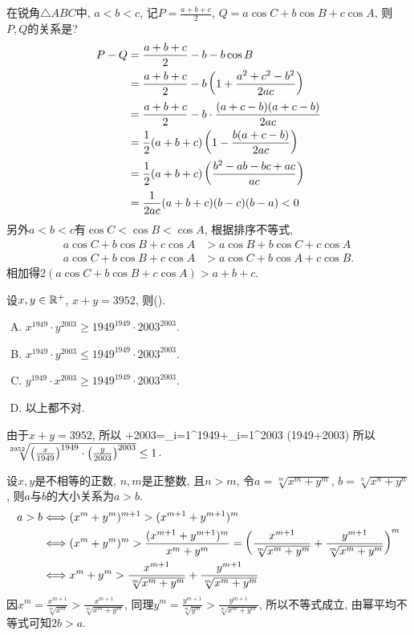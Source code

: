 \bq{}{}
在锐角$\triangle ABC$中, $a<b<c$, 记$P=\frac{a+b+c}{2}$, $Q=a\cos C+b\cos B+c\cos A$, 则$P,Q$的关系是?
\eq
\ba
\begin{align*}
 P-Q &= \frac{a+b+c}{2}-b-b\cos B\\
  &=\frac{a+b+c}{2}-b\left(1+\frac{a^2+c^2-b^2}{2ac}\right)\\
  &=\frac{a+b+c}{2}-b\cdot\frac{(a+c-b)(a+c-b)}{2ac}\\
  &=\frac12(a+b+c)\left(1-\frac{b(a+c-b)}{2ac}\right)\\
  &=\frac12(a+b+c)\left(\frac{b^2-ab-bc+ac}{ac}\right)\\
  &=\frac{1}{2ac}(a+b+c)(b-c)(b-a)<0
\end{align*}
另外$a<b<c$有$\cos C<\cos B<\cos A$, 根据排序不等式, 
\begin{align*}
a\cos C+b\cos B+c\cos A&>a\cos B+b\cos C+c\cos A\\
a\cos C+b\cos B+c\cos A&>a\cos C+b\cos A+c\cos B.
\end{align*}
相加得$2(a\cos C+b\cos B+c\cos A)>a+b+c$.
\ea

\bq{}{}
设$x,y\in\mathbb{R}^+$, $x+y=3952$, 则(\qquad).

\begin{enumerate}[A.]
 \item $x^{1949}\cdot y^{2003}\ge1949^{1949}\cdot2003^{2003}$.
 \item $x^{1949}\cdot y^{2003}\le1949^{1949}\cdot2003^{2003}$.
 \item $y^{1949}\cdot x^{2003}\ge1949^{1949}\cdot2003^{2003}$.
 \item 以上都不对.
\end{enumerate}
\eq
\ba
由于$x+y=3952$, 所以
+2003=\sum_{i=1}^{1949}+\sum_{i=1}^{2003}
  \ge(1949+2003)
\eee
所以$\sqrt[3952]{\left(\frac{x}{1949}\right)^{1949}\cdot\left(\frac{y}{2003}\right)^{2003}}\le1$.
\ea

\bq{}{}
设$x,y$是不相等的正数, $n,m$是正整数, 且$n>m$, 令$a=\sqrt[m]{x^m+y^m}$, $b=\sqrt[n]{x^n+y^n}$, 
则$a$与$b$的大小关系为\underline{$a>b$}.
\eq
\ba
\begin{align*}
 a>b&\Longleftrightarrow (x^m+y^m)^{m+1}>(x^{m+1}+y^{m+1})^m\\
  &\Longleftrightarrow (x^m+y^m)^m>\frac{(x^{m+1}+y^{m+1})^{m}}{x^m+y^m}=\left(\frac{x^{m+1}}{\sqrt[m]{x^m+y^m}}+\frac{y^{m+1}}{\sqrt[m]{x^m+y^m}}\right)^m\\
  &\Longleftrightarrow x^m+y^m>\frac{x^{m+1}}{\sqrt[m]{x^m+y^m}}+\frac{y^{m+1}}{\sqrt[m]{x^m+y^m}}
\end{align*}
因$x^m=\frac{x^{m+1}}{\sqrt[m]{x^m}}>\frac{x^{m+1}}{\sqrt[m]{x^m+y^m}}$, 
同理$y^m=\frac{y^{m+1}}{\sqrt[m]{y^m}}>\frac{y^{m+1}}{\sqrt[m]{x^m+y^m}}$,
所以不等式成立, 由幂平均不等式可知$2b>a$.
\ea


